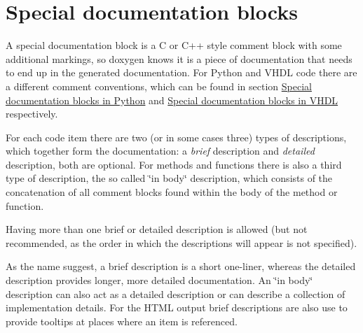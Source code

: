 \hypertarget{docblocks_specialblock}{}\section{Special documentation blocks}\label{docblocks_specialblock}
A special documentation block is a C or C++ style comment block with some additional markings, so doxygen knows it is a piece of documentation that needs to end up in the generated documentation. For Python and VHDL code there are a different comment conventions, which can be found in section \hyperlink{docblocks_pythonblocks}{Special documentation blocks in Python} and \hyperlink{docblocks_vhdlblocks}{Special documentation blocks in VHDL} respectively.

For each code item there are two (or in some cases three) types of descriptions, which together form the documentation: a {\itshape brief\/} description and {\itshape detailed\/} description, both are optional. For methods and functions there is also a third type of description, the so called \char`\"{}in body\char`\"{} description, which consists of the concatenation of all comment blocks found within the body of the method or function.

Having more than one brief or detailed description is allowed (but not recommended, as the order in which the descriptions will appear is not specified).

As the name suggest, a brief description is a short one-\/liner, whereas the detailed description provides longer, more detailed documentation. An \char`\"{}in body\char`\"{} description can also act as a detailed description or can describe a collection of implementation details. For the HTML output brief descriptions are also use to provide tooltips at places where an item is referenced.

